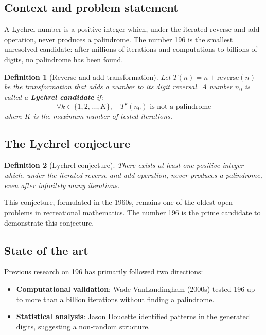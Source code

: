 \documentclass[12pt,a4paper]{article}
\newtheorem{definition}{Definition}[section]
\theoremstyle{remark}
\begin{document}
\subsection{Context and problem statement}

A Lychrel number is a positive integer which, under the iterated reverse-and-add operation, never produces a palindrome. The number 196 is the smallest unresolved candidate: after millions of iterations and computations to billions of digits, no palindrome has been found.

\begin{definition}[Reverse-and-add transformation]
Let $T(n) = n + \text{reverse}(n)$ be the transformation that adds a number to its digit reversal. A number $n_0$ is called a \textbf{Lychrel candidate} if:
\[
\forall k \in \{1, 2, \ldots, K\}, \quad T^k(n_0) \text{ is not a palindrome}
\]
where $K$ is the maximum number of tested iterations.
\end{definition}

\subsection{The Lychrel conjecture}

\begin{definition}[Lychrel conjecture]
There exists at least one positive integer which, under the iterated reverse-and-add operation, never produces a palindrome, even after infinitely many iterations.
\end{definition}

This conjecture, formulated in the 1960s, remains one of the oldest open problems in recreational mathematics. The number 196 is the prime candidate to demonstrate this conjecture.

\subsection{State of the art}

Previous research on 196 has primarily followed two directions:
\begin{itemize}
\item \textbf{Computational validation}: Wade VanLandingham (2000s) tested 196 up to more than a billion iterations without finding a palindrome.
\item \textbf{Statistical analysis}: Jason Doucette identified patterns in the generated digits, suggesting a non-random structure.
\end{itemize}
\end{document}
